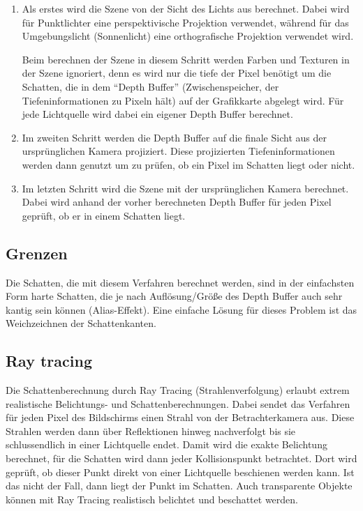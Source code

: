 \begin{enumerate}
 \item Als erstes wird die Szene von der Sicht des Lichts aus berechnet. Dabei wird für Punktlichter
       eine perspektivische Projektion verwendet, während für das Umgebungslicht (Sonnenlicht) eine
       orthografische Projektion verwendet wird.

       Beim berechnen der Szene in diesem Schritt werden Farben und Texturen in der Szene ignoriert,
       denn es wird nur die tiefe der Pixel benötigt um die Schatten, die in dem "`Depth Buffer"'
       (Zwischenspeicher, der Tiefeninformationen zu Pixeln hält) auf der Grafikkarte abgelegt wird.
       Für jede Lichtquelle wird dabei ein eigener Depth Buffer berechnet.
 \item Im zweiten Schritt werden die Depth Buffer auf die finale Sicht aus der ursprünglichen Kamera
       projiziert. Diese projizierten Tiefeninformationen werden dann genutzt um zu prüfen, ob ein
       Pixel im Schatten liegt oder nicht.
 \item Im letzten Schritt wird die Szene mit der ursprünglichen Kamera berechnet. Dabei wird anhand
       der vorher berechneten Depth Buffer für jeden Pixel geprüft, ob er in einem Schatten liegt.
\end{enumerate}

\subsection*{Grenzen}

Die Schatten, die mit diesem Verfahren berechnet werden, sind in der einfachsten Form harte Schatten,
die je nach Auflösung/Größe des Depth Buffer auch sehr kantig sein können (Alias-Effekt). Eine
einfache Lösung für dieses Problem ist das Weichzeichnen der Schattenkanten.

\subsection{Ray tracing}

Die Schattenberechnung durch Ray Tracing (Strahlenverfolgung) erlaubt extrem realistische Belichtungs-
und Schattenberechnungen.
Dabei sendet das Verfahren für jeden Pixel des Bildschirms einen Strahl von der Betrachterkamera aus.
Diese Strahlen werden dann über Reflektionen hinweg nachverfolgt bis sie schlussendlich in einer
Lichtquelle endet. Damit wird die exakte Belichtung berechnet, für die Schatten wird dann jeder
Kollisionspunkt betrachtet. Dort wird geprüft, ob dieser Punkt direkt von einer Lichtquelle
beschienen werden kann. Ist das nicht der Fall, dann liegt der Punkt im Schatten. Auch transparente
Objekte können mit Ray Tracing realistisch belichtet und beschattet werden.

